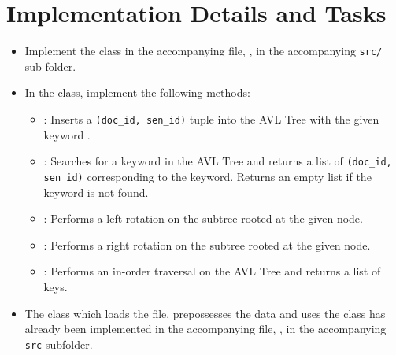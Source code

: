 \documentclass[addpoints]{exam}
\begin{document}
\section*{Implementation Details and Tasks}
\begin{itemize}
  \item Implement the  class in the accompanying file, , in the accompanying \texttt{src/} sub-folder.
  \item In the  class, implement the following methods:
  \begin{itemize}
    \item {}: Inserts a \texttt{(doc\_id, sen\_id)} tuple into the AVL Tree with the given keyword .
    \item {}: Searches for a keyword in the AVL Tree and returns a list of \texttt{(doc\_id, sen\_id)} corresponding to the keyword. 
    Returns an empty list if the keyword is not found.
    \item {}: Performs a left rotation on the subtree rooted at the given node.
    \item {}: Performs a right rotation on the subtree rooted at the given node.
    \item {}: Performs an in-order traversal on the AVL Tree and returns a list of keys.
    \end{itemize}
  \item The  class which loads the file, prepossesses the data and uses the  class has already been implemented in the accompanying file, , in the accompanying \texttt{src} subfolder.
\end{itemize}
\end{document}
